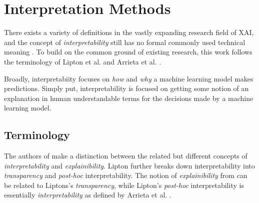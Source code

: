 \section{Interpretation Methods}
\label{sec:interpretation_methods}

There exists a variety of definitions in the vastly expanding research field of XAI, and the concept of \textit{interpretability} still has no formal commonly used technical meaning \cite{lipton2018mythos}. To build on the common ground of existing research, this work follows the terminology of Lipton et al. \cite{lipton2018mythos} and Arrieta et al. \cite{arrieta2020explainable}.

Broadly, interpretabiity focuses on \textit{how} and \textit{why} a machine learning model makes predictions.
Simply put, interpretability is focused on getting some notion of an explanation in human understandable terms for the decisions made by a machine learning model.

\subsection{Terminology}
\label{subsec:interpretation_methods_terminology}
The authors of \cite{arrieta2020explainable} make a distinction between the related but different concepts of \textit{interpretability} and \textit{explainibility}. Lipton \cite{lipton2018mythos} further breaks down interpretability into \textit{transparency} and \textit{post-hoc} interpretability. The notion of \textit{explainibility} from \cite{arrieta2020explainable} can be related to Liptons's \textit{transparency}, while Lipton's \textit{post-hoc} interpretability is essentially \textit{interpretability} as defined by Arrieta et al. \cite{arrieta2020explainable}.


